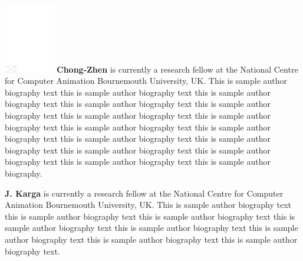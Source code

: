 \documentclass[CJCE,STIX2COL]{WileyNJD-v2}
\begin{document}
\vfill\eject


\begin{biography}{\includegraphics[width=66pt,height=86pt,draft]{empty}}{\textbf{Chong-Zhen} is currently a research fellow at the National Centre for Computer Animation Bournemouth University, UK. This is sample author biography text this is sample author biography text this is sample author biography text this is sample author biography text this is sample author biography text this is sample author biography text this is sample author biography text this is sample author biography text this is sample author biography text this is sample author biography text this is sample author biography text this is sample author biography text this is sample author biography text this is sample author biography text this is sample author biography.}
\end{biography}

\begin{biography}{}{\textbf{J. Karga} is currently a research fellow at the National Centre for Computer Animation Bournemouth University, UK. This is sample author biography text this is sample author biography text this is sample author biography text this is sample author biography text this is sample author biography text this is sample author biography text this is sample author biography text this is sample author biography text.}
\end{biography}
\end{document}
